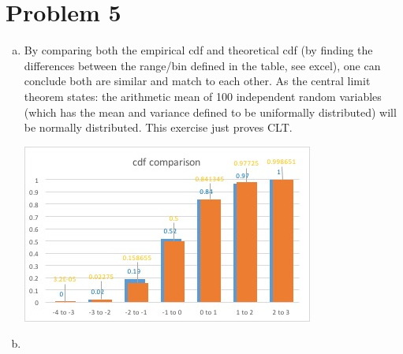 \documentclass{article}   	                         %
\begin{document}
\section*{Problem 5}
\begin{enumerate}[(a)]
\item
By comparing both the empirical cdf and theoretical cdf (by finding the differences between the range/bin defined in the table, see excel), one can conclude both are similar and match to each other. As the central limit theorem states: the arithmetic mean of 100 independent random variables (which has the mean and variance defined to be uniformally distributed) will be normally distributed. This exercise just proves CLT.\\
\begin{center}
\includegraphics{Picture1.jpg}
\end{center}
\item

\end{enumerate}
\end{document}
